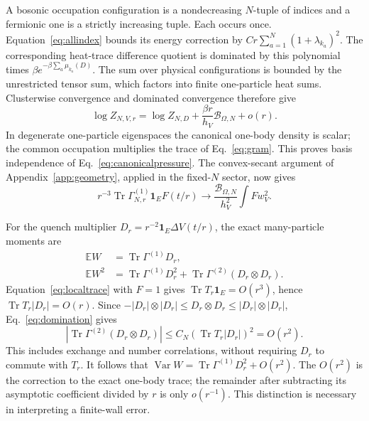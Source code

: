 \documentclass[aps,pra,reprint,superscriptaddress,longbibliography]{revtex4-2}
\newcommand{\Tr}{\operatorname{Tr}}
\newcommand{\Var}{\operatorname{Var}}
\newcommand{\E}{\mathbb E}
\newcommand{\calB}{\mathcal B}
\begin{document}
A bosonic occupation configuration is a nondecreasing $N$-tuple of indices and a fermionic one is a strictly increasing tuple. Each occurs once. Equation~\eqref{eq:allindex} bounds its energy correction by $Cr\sum_{a=1}^N(1+\lambda_{k_a})^2$. The corresponding heat-trace difference quotient is dominated by this polynomial times $\beta e^{-\beta\sum_a\mu_{k_a}(D)}$. The sum over physical configurations is bounded by the unrestricted tensor sum, which factors into finite one-particle heat sums. Clusterwise convergence and dominated convergence therefore give
\begin{equation}
 \log Z_{N,V,r}=\log Z_{N,D}+
                         \frac{\beta r}{h_V}\calB_{\Omega,N}+o(r).
 \label{eq:canonicalexp}
\end{equation}
In degenerate one-particle eigenspaces the canonical one-body density is scalar; the common occupation multiplies the trace of Eq.~\eqref{eq:gram}. This proves basis independence of Eq.~\eqref{eq:canonicalpressure}. The convex-secant argument of Appendix~\ref{app:geometry}, applied in the fixed-$N$ sector, now gives
\begin{equation}
 r^{-3}\Tr\Gamma^{(1)}_{N,r}\mathbf1_EF(t/r)
       \to\frac{\calB_{\Omega,N}}{h_V^2}\int Fw_V^2.
 \label{eq:canonicaltrace}
\end{equation}

For the quench multiplier $D_r=r^{-2}\mathbf1_E\Delta V(t/r)$, the exact many-particle moments are
\begin{align}
 \E W&=\Tr\Gamma^{(1)}D_r,\nonumber\\
 \E W^2&=\Tr\Gamma^{(1)}D_r^2+
                  \Tr\Gamma^{(2)}(D_r\otimes D_r).\label{eq:canonicalmoments}
\end{align}
Equation~\eqref{eq:localtrace} with $F=1$ gives $\Tr T_r\mathbf1_E=O(r^3)$, hence $\Tr T_r|D_r|=O(r)$. Since $-|D_r|\otimes|D_r|\le D_r\otimes D_r\le |D_r|\otimes|D_r|$, Eq.~\eqref{eq:domination} gives
\begin{equation}
 |\Tr\Gamma^{(2)}(D_r\otimes D_r)|
                   \le C_N(\Tr T_r|D_r|)^2=O(r^2).\label{eq:pair}
\end{equation}
This includes exchange and number correlations, without requiring $D_r$ to commute with $T_r$. It follows that $\Var W=\Tr\Gamma^{(1)}D_r^2+O(r^2)$. The $O(r^2)$ is the correction to the exact one-body trace; the remainder after subtracting its asymptotic coefficient divided by $r$ is only $o(r^{-1})$. This distinction is necessary in interpreting a finite-wall error.
\end{document}
